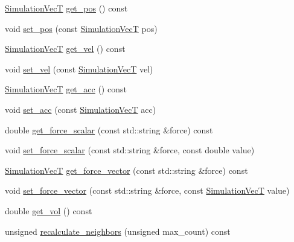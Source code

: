\begin{DoxyCompactItemize}
\item 
\mbox{\hyperlink{namespacewash_ab2cbbc37941b733095c9225b49b4cad9}{Simulation\+VecT}} \mbox{\hyperlink{classwash_1_1Particle_a9d222d453d640cf629ee8dfbee6b43c2}{get\+\_\+pos}} () const
\item 
void \mbox{\hyperlink{classwash_1_1Particle_af06835533935c04e594c258a7dcdd1ef}{set\+\_\+pos}} (const \mbox{\hyperlink{namespacewash_ab2cbbc37941b733095c9225b49b4cad9}{Simulation\+VecT}} pos)
\item 
\mbox{\hyperlink{namespacewash_ab2cbbc37941b733095c9225b49b4cad9}{Simulation\+VecT}} \mbox{\hyperlink{classwash_1_1Particle_a890d0f1467225393e385872b0c98b974}{get\+\_\+vel}} () const
\item 
void \mbox{\hyperlink{classwash_1_1Particle_a4755365883cfd62117ebe74fe44d35e0}{set\+\_\+vel}} (const \mbox{\hyperlink{namespacewash_ab2cbbc37941b733095c9225b49b4cad9}{Simulation\+VecT}} vel)
\item 
\mbox{\hyperlink{namespacewash_ab2cbbc37941b733095c9225b49b4cad9}{Simulation\+VecT}} \mbox{\hyperlink{classwash_1_1Particle_afb8c9dce2692cdfab61a3a87fde50610}{get\+\_\+acc}} () const
\item 
void \mbox{\hyperlink{classwash_1_1Particle_a395e095de0b2af7dfc925bedef2090a1}{set\+\_\+acc}} (const \mbox{\hyperlink{namespacewash_ab2cbbc37941b733095c9225b49b4cad9}{Simulation\+VecT}} acc)
\item 
double \mbox{\hyperlink{classwash_1_1Particle_ab42a162b41a4e8cf6212bd9c43f3a0cf}{get\+\_\+force\+\_\+scalar}} (const std\+::string \&force) const
\item 
void \mbox{\hyperlink{classwash_1_1Particle_a2c3038c8eac34e371922bcf1ab79b8ca}{set\+\_\+force\+\_\+scalar}} (const std\+::string \&force, const double value)
\item 
\mbox{\hyperlink{namespacewash_ab2cbbc37941b733095c9225b49b4cad9}{Simulation\+VecT}} \mbox{\hyperlink{classwash_1_1Particle_a9c6ec5d5a7407897ecca00549bd05c01}{get\+\_\+force\+\_\+vector}} (const std\+::string \&force) const
\item 
void \mbox{\hyperlink{classwash_1_1Particle_a6960cdd169d1829a52e49cf835a8bfeb}{set\+\_\+force\+\_\+vector}} (const std\+::string \&force, const \mbox{\hyperlink{namespacewash_ab2cbbc37941b733095c9225b49b4cad9}{Simulation\+VecT}} value)
\item 
double \mbox{\hyperlink{classwash_1_1Particle_ab16021a2c003de07dc0a418ffc3d5eb7}{get\+\_\+vol}} () const
\item 
unsigned \mbox{\hyperlink{classwash_1_1Particle_a570fc3286ab83d081950a5fb3d548d92}{recalculate\+\_\+neighbors}} (unsigned max\+\_\+count) const

\end{DoxyCompactItemize}
